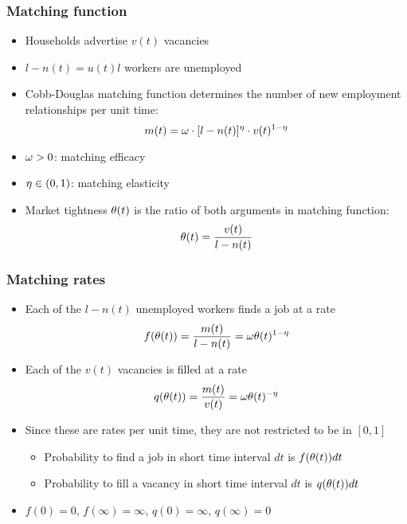 \documentclass[11pt,aspectratio=169,xcolor={dvipsnames},hyperref={pdftex,pdfpagemode=UseNone,hidelinks,pdfdisplaydoctitle=true},usepdftitle=false]{beamer}
\begin{document}
\begin{frame}
\frametitle{Matching function}
\begin{itemize}
\item Households advertise $v(t)$ vacancies
\item $l - n(t) = u(t) l$ workers are unemployed
\item Cobb-Douglas matching function determines the number of new employment relationships per unit time: 
\vspace*{-2mm}\begin{equation*}
m(t)=\omega \cdot [l-n(t)]^{\eta} \cdot v(t)^{1-\eta}
\end{equation*} 
\item $\omega>0$: matching efficacy
\item $\eta\in(0,1)$: matching elasticity
\item Market tightness $\theta(t)$ is the ratio of both arguments in matching function:
\vspace*{-2mm}\begin{equation*}
\theta(t) = \frac{v(t)}{l-n(t)}
\end{equation*}
\end{itemize}	
\end{frame}

\begin{frame}
\frametitle{Matching rates}
\begin{itemize}
\item Each of the $l-n(t)$ unemployed workers finds a job at a rate
\begin{equation*}
f(\theta(t)) = \frac{m(t)}{l-n(t)}= \omega \theta(t)^{1-\eta}
\end{equation*}
\item Each of the $v(t)$ vacancies is filled at a rate
\begin{equation*}
q(\theta(t))= \frac{m(t)}{v(t)}= \omega  \theta(t)^{-\eta}
\end{equation*}
\item Since these are rates per unit time, they are not restricted to be in $[0,1]$
\begin{itemize}
\item Probability to find a job in short time interval $dt$ is $f(\theta(t)) dt$
\item Probability to fill a vacancy in short time interval $dt$ is $q(\theta(t)) dt$
\end{itemize}
\item $f(0)=0$, $f(\infty) = \infty$, $q(0)=\infty$, $q(\infty) = 0$
\end{itemize}	
\end{frame}
\end{document}
